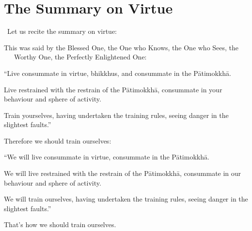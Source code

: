 \section{The Summary on Virtue}
\label{siluddesa-patha-english}

\begin{intro}
	\anglebracketleft\ \hspace{-0.5mm}Let us recite the summary on virtue: \hspace{-0.5mm}\anglebracketright\
\end{intro}

\begin{hanging-indent}
This was said by the Blessed One, the One who Knows, the One who Sees, the Worthy One, the Perfectly Enlightened One:
\end{hanging-indent}
\begin{hanging-indent-together}
``Live consummate in virtue, bhikkhus, and consummate in the Pātimokkhā.
\end{hanging-indent-together}
\begin{hanging-indent-together}
Live restrained with the restrain of the Pātimokkhā, consummate in your behaviour and sphere of activity.
\end{hanging-indent-together}
\begin{hanging-indent-together}
Train yourselves, having undertaken the training rules, seeing danger in the slightest faults.''
\end{hanging-indent-together}

\begin{hanging-indent}
Therefore we should train ourselves:
\end{hanging-indent}
\begin{hanging-indent-together}
``We will live consummate in virtue, consummate in the Pātimokkhā.
\end{hanging-indent-together}
\begin{hanging-indent-together}
We will live restrained with the restrain of the Pātimokkhā, consummate in our behaviour and sphere of activity.
\end{hanging-indent-together}
\begin{hanging-indent-together}
We will train ourselves, having undertaken the training rules, seeing danger in the slightest faults.''
\end{hanging-indent-together}
\begin{hanging-indent-together}
That's how we should train ourselves.
\end{hanging-indent-together}

\suttaRef{[MN 6]}

\clearpage

